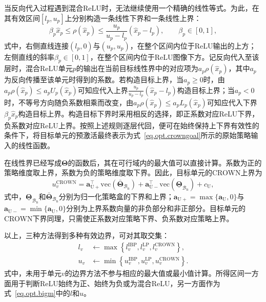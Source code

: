 当反向代入过程遇到混合ReLU时，无法继续使用一个精确的线性等式。为此，在其有效区间$[l_p,u_p]$上分别构造一条线性下界和一条线性上界：
\begin{equation}
\beta_p\hat x_p
\leq
\rho(\hat x_p)
\leq
\frac{u_p}{u_p-l_p}
\left(\hat x_p-l_p\right),
\qquad
\beta_p\in[0,1],
\label{eq.opt.crownrelu}
\end{equation}
式中，右侧直线连接$(l_p,0)$与$(u_p,u_p)$，在整个区间内位于ReLU输出的上方；左侧直线的斜率$\beta_p\in[0,1]$，在整个区间内位于ReLU图像下方。记反向代入至该层时，混合ReLU单元$p$的输出在当前目标线性界中的对应项为$a_p\rho(\hat x_p)$，其中$a_p$为反向传播至该单元时得到的系数。若构造目标上界，当$a_p\geq0$时，由$a_p\rho(\hat x_p)\leq a_pU_p(\hat x_p)$可知应代入上界$\frac{u_p}{u_p-l_p}\left(\hat x_p-l_p\right)$构造目标上界；当$a_p<0$时，不等号方向随负系数相乘而改变，由$a_p\rho(\hat x_p)\leq a_pL_p(\hat x_p)$可知应代入下界$\beta_p\hat x_p$构造目标上界。构造目标下界时采用相反的选择，即正系数对应ReLU下界，负系数对应ReLU上界。按照上述规则逐层代回，便可在始终保持上下界有效性的条件下，将目标单元的预激活最终表示为式~\eqref{eq.opt.crowngoal}所示的原始策略输入的线性函数。

在线性界已经写成$\bm\Theta$的函数后，其在可行域内的最大值可以直接计算。系数为正的策略维度取上界，系数为负的策略维度取下界。因此，目标单元的CROWN上界为
\begin{equation}
u_{v}^{\mathrm{CROWN}}
=
\bm a_{\mathrm{U}+}^{\top}
\mathrm{vec}\left(\bar{\bm\Theta}_{\mathcal B_{\mathrm n}}\right)
+
\bm a_{\mathrm{U}-}^{\top}
\mathrm{vec}\left(\underline{\bm\Theta}_{\mathcal B_{\mathrm n}}\right)
+c_{\mathrm U},
\label{eq.opt.crownconc}
\end{equation}
式中，$\underline{\bm\Theta}_{\mathcal B_{\mathrm n}}$和$\bar{\bm\Theta}_{\mathcal B_{\mathrm n}}$分别为归一化策略盒的下界和上界；$\bm a_{\mathrm{U}+}=\max\{\bm a_{\mathrm U},0\}$与$\bm a_{\mathrm{U}-}=\min\{\bm a_{\mathrm U},0\}$分别为上界系数向量的非负部分和非正部分。目标单元的CROWN下界同理，只需使正系数对应策略下界、负系数对应策略上界。

以上，三种方法得到多种有效边界，可对其取交集：
\begin{equation}
\begin{aligned}
l_v&\leftarrow
\max\left\{
l_v^{\mathrm{IBP}},
l_v^{\mathrm{LP}},
l_v^{\mathrm{CROWN}}
\right\},\\
u_v&\leftarrow
\min\left\{
u_v^{\mathrm{IBP}},
u_v^{\mathrm{LP}},
u_v^{\mathrm{CROWN}}
\right\}.
\end{aligned}
\label{eq.opt.boundintersection}
\end{equation}
式中，未用于单元$v$的边界方法不参与相应的最大值或最小值计算。所得区间一方面用于判断ReLU始终为正、始终为负或为混合ReLU，另一方面作为式~\eqref{eq.opt.bigm}中的$l$和$u$。

